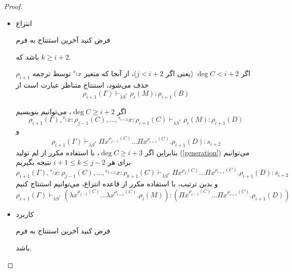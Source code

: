 \begin{proof}
\begin{itemize}
\item انتزاع

فرض کنید آخرین استنتاج به فرم
\begin{prooftree}
\end{prooftree}
باشد که
$k \ge i+2$.

اگر
$\operatorname{deg} C < i + 2$ (یعنی اگر $j < i+2$)،
از آنجا که متغیر
${}^{s_{j}}x$
توسط ترجمه
$\rho_{i+1}$
حذف می‌شود، استنتاج متناظر عبارت است از
\begin{equation*}
\rho_{i+1}(\Gamma) \vdash_{\lambda S^*} \rho_i(M) : \rho_{i+1}(B)
\end{equation*}

اگر
$\operatorname{deg} C \ge i + 2$،
می‌توانیم بنویسیم
\begin{equation*}
\rho_{i+1}(\Gamma), {}^{s_j}x:\rho_{j-1}(C), \dots, {}^{s_{i+2}}x:\rho_{i+1}(C) \vdash_{\lambda S^*} \rho_i(M) : \rho_{i+1}(D)
\end{equation*}
و
\begin{equation*}
\rho_{i+1}(\Gamma) \vdash_{\lambda S^*} \Pi x^{\rho_{j-1}(C)} \dots \Pi x^{\rho_{i+1}(C)}.\rho_{i+1}(D) : s_{i+2}
\end{equation*}
بنابراین اگر
$\operatorname{deg} C \ge i + 3$،
با استفاده مکرر از لم تولید
(\ref{generation})
می‌توانیم برای هر
$i+1 \le k \le j-2$
نتیجه بگیریم
\begin{equation*}
\rho_{i+1}(\Gamma), {}^{s_j}x:\rho_{j-1}(C), \dots, {}^{s_{k+2}}x:\rho_{k+1}(C) \vdash_{\lambda S^*} \Pi x^{\rho_{k}(C)} \dots \Pi x^{\rho_{i+1}(C)}.\rho_{i+1}(D) : s_{i+2}
\end{equation*}
و بدین ترتیب، با استفاده مکرر از قاعده انتزاع، می‌توانیم استنتاج کنیم
\begin{equation*}
\rho_{i+1}(\Gamma) \vdash_{\lambda S^*} (\lambda x^{\rho_{j-1}(C)} \dots \lambda x^{\rho_{i+1}(C)}.\rho_{i}(M)) : (\Pi x^{\rho_{j-1}(C)} \dots \Pi x^{\rho_{i+1}(C)}.\rho_{i+1}(D))
\end{equation*}

\item کاربرد

فرض کنید آخرین استنتاج به فرم
\begin{prooftree}
\end{prooftree}
باشد.


\end{itemize}
\end{proof}
